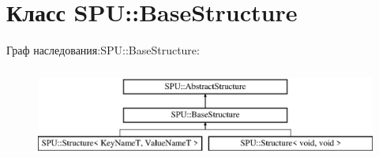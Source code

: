 \hypertarget{class_s_p_u_1_1_base_structure}{}\section{Класс S\+PU\+:\+:Base\+Structure}
\label{class_s_p_u_1_1_base_structure}
Граф наследования\+:S\+PU\+:\+:Base\+Structure\+:\begin{figure}[H]
\begin{center}
\leavevmode
\includegraphics[height=3.000000cm]{class_s_p_u_1_1_base_structure}
\end{center}
\end{figure}
